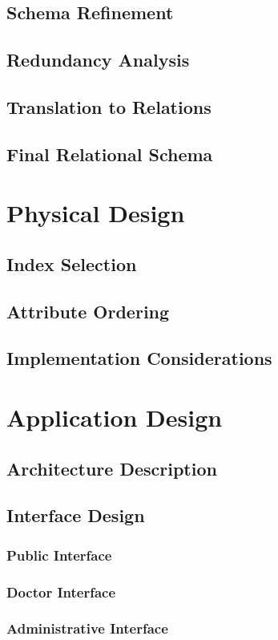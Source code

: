 \documentclass[12pt,a4paper]{report}
\begin{document}
\section{Schema Refinement}
\section{Redundancy Analysis}
\section{Translation to Relations}
\section{Final Relational Schema}

\chapter{Physical Design}
\section{Index Selection}
\section{Attribute Ordering}
\section{Implementation Considerations}

\chapter{Application Design}
\section{Architecture Description}
\section{Interface Design}
\subsection{Public Interface}
\subsection{Doctor Interface}
\subsection{Administrative Interface}
\end{document}
